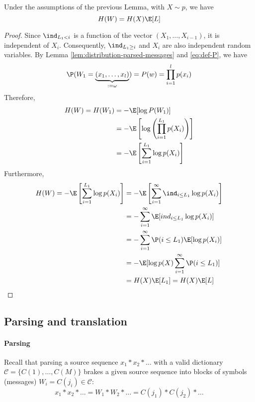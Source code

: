 \documentclass[toc]{../cs-classes/cs-classes}
\begin{document}
\begin{property}
    Under the assumptions of the previous Lemma, with $X\sim p$, we have
    \begin{equation}
        \label{eq:parsed-message-entropy}
        H(W) = H(X) \E[L]
    \end{equation}
\end{property}
\begin{proof}
    Since $\ind_{L_1<i}$ is a function of the vector $(X_1, \dots, X_{i-1})$, it is independent of $X_i$. Consequently, $\ind_{L_1\geq i}$ and $X_i$ are also independent random variables. By Lemma \ref{lem:distribution-parsed-messages} and \eqref{eq:def-P}, we have
    \begin{equation*}
        \P(W_1 = \underbrace{(x_1, \dots, x_l)}_{:=\omega}) = P(w) = \prod_{i=1}^l p(x_i)
    \end{equation*}
    Therefore,
    \begin{equation*}
        \begin{aligned}
            H(W) = H(W_1) &= - \E[\log P(W_1)]\\
            &= -\E\left[\log\left(\prod_{i=1}^{L_1}p(X_i)\right)\right]\\
            &= -\E\left[\sum_{i=1}^{L_1}\log p(X_i)\right]
        \end{aligned}
    \end{equation*}
    Furthermore,
    \begin{equation*}
        \begin{aligned}
            H(W) = -\E\left[\sum_{i=1}^{L_1}\log p(X_i)\right] &= -\E\left[\sum_{i=1}^\infty \ind_{i\leq L_1}\log p(X_i)\right]\\
            &= - \sum_{i=1}^\infty \E[ind_{i\leq L_1} \log p(X_i)]\\
            &= - \sum_{i=1}^\infty \P(i\leq L_1) \E[\log p(X_i)]\\
            &= -\E[\log p(X) \sum_{i=1}^\infty \P(i\leq L_1)]\\
            &= H(X) \E[L_1] = H(X)\E[L]
        \end{aligned}
    \end{equation*}
\end{proof}

\subsection{Parsing and translation}
\paragraph*{Parsing} Recall that parsing a source sequence $x_1*x_2 * \dots$ with a valid dictionary $\mathcal{C} = \{C(1), \dots, C(M)\}$ brakes a given source sequence into blocks of symbols (messages) $W_i = C(j_i)\in\mathcal{C}$:
\begin{equation*}
    x_1*x_2*\dots = W_1 * W_2 * \dots = C(j_1) * C(j_2) * \dots
\end{equation*}
\end{document}
